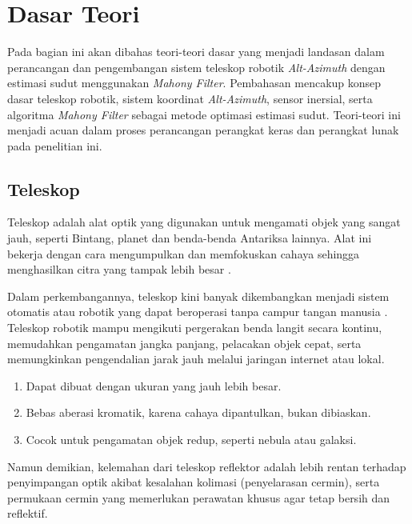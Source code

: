 \section{Dasar Teori} \label{II.Teori}
Pada bagian ini akan dibahas teori-teori dasar yang menjadi landasan dalam perancangan dan pengembangan sistem teleskop robotik \textit{Alt-Azimuth} dengan estimasi sudut menggunakan \textit{Mahony Filter}. Pembahasan mencakup konsep dasar teleskop robotik, sistem koordinat \textit{Alt-Azimuth}, sensor inersial, serta algoritma \textit{Mahony Filter} sebagai metode optimasi estimasi sudut. Teori-teori ini menjadi acuan dalam proses perancangan perangkat keras dan perangkat lunak pada penelitian ini. \par
\subsection{Teleskop} \label{II.Teori1}
Teleskop adalah alat optik yang digunakan untuk mengamati objek yang sangat jauh, seperti Bintang, planet dan benda-benda Antariksa lainnya\cite{Bradley2014}. Alat ini bekerja dengan cara mengumpulkan dan memfokuskan cahaya sehingga menghasilkan citra yang tampak lebih besar \cite{Bradley2014} \cite{HannuKarttunen2017} \cite{Roy2018}. \par

Dalam perkembangannya, teleskop kini banyak dikembangkan menjadi sistem otomatis atau robotik yang dapat beroperasi tanpa campur tangan manusia \cite{Dyer2020}. Teleskop robotik mampu mengikuti pergerakan benda langit secara kontinu, memudahkan pengamatan jangka panjang, pelacakan objek cepat, serta memungkinkan pengendalian jarak jauh melalui jaringan internet atau lokal. \par

\begin{enumerate}[noitemsep]
	\item Dapat dibuat dengan ukuran yang jauh lebih besar.
	
	\item Bebas aberasi kromatik, karena cahaya dipantulkan, bukan dibiaskan.
	
	\item Cocok untuk pengamatan objek redup, seperti nebula atau galaksi.
\end{enumerate}

Namun demikian, kelemahan dari teleskop reflektor adalah lebih rentan terhadap penyimpangan optik akibat kesalahan kolimasi (penyelarasan cermin), serta permukaan cermin yang memerlukan perawatan khusus agar tetap bersih dan reflektif. \par

